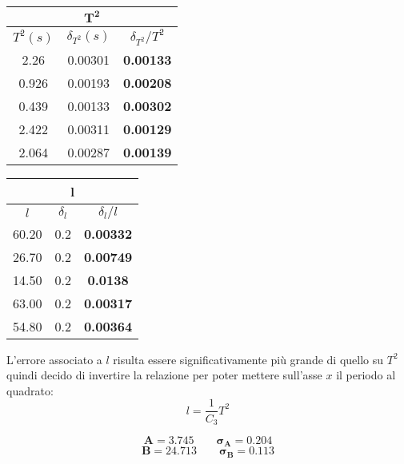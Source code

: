 \documentclass{article}
\begin{document}
\begin{minipage}{0.5\textwidth}
	\begin{table}[H]
		\centering
		\begin{tabular}{@{}ccc@{}}
			\multicolumn{3}{c}{$\mathbf{T^2}$} \\ \midrule
			$T^2(s)$ & $\delta_{T^2} (s)$ & $\delta_{T^2} / T^2$ \\ \midrule
			2.26 & 0.00301 & \textbf{0.00133 }\\
			0.926 & 0.00193 & \textbf{0.00208} \\
			0.439 & 0.00133 & \textbf{0.00302} \\
			2.422 & 0.00311 & \textbf{0.00129} \\
			2.064 & 0.00287 & \textbf{0.00139}  \\ \bottomrule   
		\end{tabular}
	\end{table}
\end{minipage}
\begin{minipage}{0.5\textwidth}
	\begin{table}[H]
		\centering
		\begin{tabular}{@{}ccc@{}}
			\multicolumn{3}{c}{\textbf{l}} \\ \midrule
			$l$ & $\delta_l$ & $\delta_l / l$ \\ \midrule
			60.20 & 0.2 & \textbf{0.00332} \\
			26.70 & 0.2 & \textbf{0.00749} \\
			14.50 & 0.2 & \textbf{0.0138} \\
			63.00 & 0.2 & \textbf{0.00317} \\
			54.80 & 0.2 & \textbf{0.00364} \\ \bottomrule  
		\end{tabular}
	\end{table}
\end{minipage}
\vspace{1cm}

\noindent
L'errore associato a $l$ risulta essere significativamente più grande di quello su $T^2$ quindi decido di invertire la relazione per poter mettere sull'asse $x$ il periodo al quadrato:
\[
 l = \frac{1}{C_3} T^2
\]

\[
\mathbf{A} = 3.745 \qquad \mathbf{\sigma_A} = 0.204
\]
\[
\mathbf{B} = 24.713 \qquad \mathbf{\sigma_B} = 0.113
\]
\end{document}
